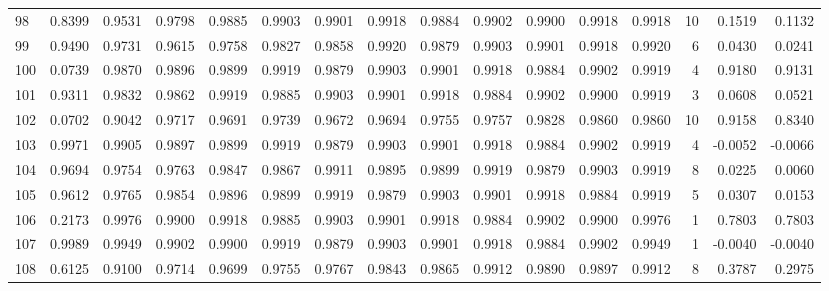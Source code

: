 \begin{tabular}{lrrrrrrrrrrrrrrr}
98  &      0.8399 &  0.9531 &  0.9798 &  0.9885 &  0.9903 &  0.9901 &  0.9918 &  0.9884 &  0.9902 &  0.9900 &   0.9918 &     0.9918 &     10 &                    0.1519 &                     0.1132 \\
99  &      0.9490 &  0.9731 &  0.9615 &  0.9758 &  0.9827 &  0.9858 &  0.9920 &  0.9879 &  0.9903 &  0.9901 &   0.9918 &     0.9920 &      6 &                    0.0430 &                     0.0241 \\
100 &      0.0739 &  0.9870 &  0.9896 &  0.9899 &  0.9919 &  0.9879 &  0.9903 &  0.9901 &  0.9918 &  0.9884 &   0.9902 &     0.9919 &      4 &                    0.9180 &                     0.9131 \\
101 &      0.9311 &  0.9832 &  0.9862 &  0.9919 &  0.9885 &  0.9903 &  0.9901 &  0.9918 &  0.9884 &  0.9902 &   0.9900 &     0.9919 &      3 &                    0.0608 &                     0.0521 \\
102 &      0.0702 &  0.9042 &  0.9717 &  0.9691 &  0.9739 &  0.9672 &  0.9694 &  0.9755 &  0.9757 &  0.9828 &   0.9860 &     0.9860 &     10 &                    0.9158 &                     0.8340 \\
103 &      0.9971 &  0.9905 &  0.9897 &  0.9899 &  0.9919 &  0.9879 &  0.9903 &  0.9901 &  0.9918 &  0.9884 &   0.9902 &     0.9919 &      4 &                   -0.0052 &                    -0.0066 \\
104 &      0.9694 &  0.9754 &  0.9763 &  0.9847 &  0.9867 &  0.9911 &  0.9895 &  0.9899 &  0.9919 &  0.9879 &   0.9903 &     0.9919 &      8 &                    0.0225 &                     0.0060 \\
105 &      0.9612 &  0.9765 &  0.9854 &  0.9896 &  0.9899 &  0.9919 &  0.9879 &  0.9903 &  0.9901 &  0.9918 &   0.9884 &     0.9919 &      5 &                    0.0307 &                     0.0153 \\
106 &      0.2173 &  0.9976 &  0.9900 &  0.9918 &  0.9885 &  0.9903 &  0.9901 &  0.9918 &  0.9884 &  0.9902 &   0.9900 &     0.9976 &      1 &                    0.7803 &                     0.7803 \\
107 &      0.9989 &  0.9949 &  0.9902 &  0.9900 &  0.9919 &  0.9879 &  0.9903 &  0.9901 &  0.9918 &  0.9884 &   0.9902 &     0.9949 &      1 &                   -0.0040 &                    -0.0040 \\
108 &      0.6125 &  0.9100 &  0.9714 &  0.9699 &  0.9755 &  0.9767 &  0.9843 &  0.9865 &  0.9912 &  0.9890 &   0.9897 &     0.9912 &      8 &                    0.3787 &                     0.2975 \\

\end{tabular}
